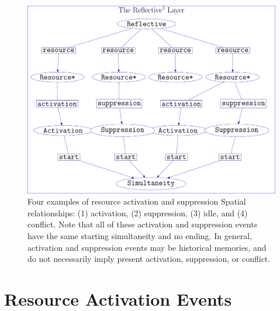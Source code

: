\begin{figure}
\center
\includegraphics[width=12cm]{gfx/example_resource_conflict}
\caption[Four examples of resource activation and suppression Spatial
  relationships.]{Four examples of resource activation and suppression
  Spatial relationships: (1) activation, (2) suppression, (3) idle,
  and (4) conflict.  Note that all of these activation and suppression
  events have the same starting simultaneity and no ending.  In
  general, activation and suppression events may be historical
  memories, and do not necessarily imply present activation,
  suppression, or conflict.}
\label{figure:example_resource_conflict}
\end{figure}


\section{Resource Activation Events}

